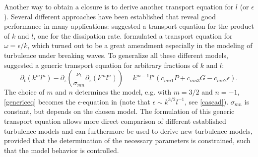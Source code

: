 Another way to obtain a closure is to derive another transport equation for $l$ (or $\epsilon$). Several different approaches have been established that reveal good performance in many applications: \cite{mellor1982} suggested a transport equation for the product of $k$ and $l$, \cite{burchard1995} one for the dissipation rate. \cite{wilcox1998} formulated a transport equation for $\omega = \epsilon \slash k$, which turned out to be a great amendment especially in the modeling of turbulence under breaking waves. To generalize all these different models, \cite{UmlaufBurchard2003a} suggested a generic transport equation for arbitrary fractions of $k$ and $l$:
\begin{equation}
 \label{genericeq}
 \partial_t (k^m l^n) - \partial_z \left( \frac{\nu_t}{\sigma_{mn}} \partial_z(k^m l^n) \right) = k^{m-1} l^n (c_{mn1}P + c_{mn3} G - c_{mn2} \epsilon ).
\end{equation}
The choice of $m$ and $n$ determines the model, e.g. with $m=3 \slash 2$ and $n=-1$, \eqref{genericeq} becomes the $\epsilon$-equation in \cite{burchard1995} (note that $\epsilon \sim k^{3 \slash 2} l^{-1}$, see \eqref{cascad}). $\sigma_{mn}$ is constant, but depends on the chosen model. The formulation of this generic transport equation allows more direct comparison of different established turbulence models and can furthermore be used to derive new turbulence models, provided that the determination of the necessary parameters is constrained, such that the model behavior is controlled. 

